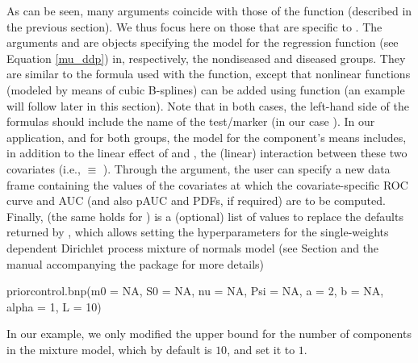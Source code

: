 As can be seen, many arguments coincide with those of the function  (described in the previous section). We thus focus here on those that are specific to . The arguments  and  are  objects specifying the model for the regression function (see Equation \eqref{mu_ddp}) in, respectively, the nondiseased and diseased groups. They are similar to the formula used with the  function, except that nonlinear functions (modeled by means of cubic B-splines) can be added using function  (an example will follow later in this section). Note that in both cases, the left-hand side of the formulas should include the name of the test/marker (in our case ). In our application, and for both groups, the model for the component's means includes, in addition to the linear effect of  and , the (linear) interaction between these two covariates (i.e.,  $\equiv$ ). Through the  argument, the user can specify a new data frame containing the values of the covariates at which the covariate-specific ROC curve and AUC (and also pAUC and PDFs, if required) are to be computed. Finally,  (the same holds for ) is a (optional) list of values to replace the defaults returned by , which allows setting the hyperparameters for the single-weights dependent Dirichlet process mixture of normals model (see Section  and the manual accompanying the package for more details) 
\begin{example}
priorcontrol.bnp(m0 = NA, S0 = NA, nu = NA, Psi = NA, a = 2, b = NA, 
   alpha = 1, L = 10)
\end{example}
In our example, we only modified the upper bound for the number of components in the mixture model, which by default is $10$, and set it to $1$.

